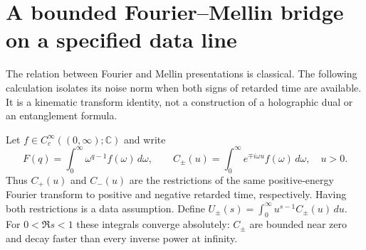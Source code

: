 \section{A bounded Fourier--Mellin bridge on a specified data line}
\label{sec:frameworkbridge}
The relation between Fourier and Mellin presentations is classical.
The following calculation isolates its noise norm when both signs of
retarded time are available. It is a kinematic transform identity, not
a construction of a holographic dual or an entanglement formula.

Let $f\in C_c^\infty((0,\infty);\mathbb C)$ and write
\[
 F(q)=\int_0^\infty\omega^{q-1}f(\omega)\,d\omega,
 \qquad
 C_\pm(u)=\int_0^\infty e^{\mp i\omega u}f(\omega)\,d\omega,
 \quad u>0.
\]
Thus $C_+(u)$ and $C_-(u)$ are the restrictions of the same
positive-energy Fourier transform to positive and negative retarded
time, respectively. Having both restrictions is a data assumption.
Define $U_\pm(s)=\int_0^\infty u^{s-1}C_\pm(u)\,du$.
For $0<\Re s<1$ these integrals converge absolutely: $C_\pm$ are
bounded near zero and decay faster than every inverse power at infinity.

